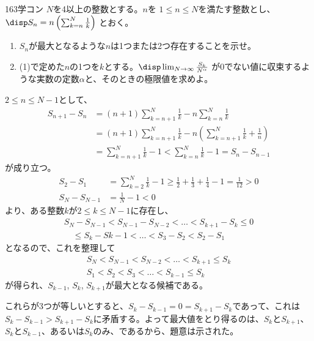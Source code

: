\begin{prob}{163}{\maru}{学コン}
 $N$を4以上の整数とする。$n$を $1\le n \le N$を満たす整数とし、$\disp S_n=n\left(\sum_{k=n}^N \frac{1}{k}\right)$ とおく。
 \begin{enumerate}
  \item $S_n$が最大となるような$n$は1つまたは2つ存在することを示せ。
  \item (1)で定めた$n$の1つを$k$とする。$\disp \lim_{N\to\infty} \frac{S_k}{N^\alpha}$ が0でない値に収束するような実数の定数$\alpha$と、そのときの極限値を求めよ。
 \end{enumerate}
\end{prob}
$2\le n\le N-1$として、
\begin{align*}
 S_{n+1}-S_n&=(n+1)\sum_{k=n+1}^N\frac{1}{k}-n\sum_{k=n}^N\frac{1}{k} \\
 &=(n+1)\sum_{k=n+1}^N\frac{1}{k}-n\left(\sum_{k=n+1}^N\frac{1}{k}+\frac{1}{n}\right) \\
 &=\sum_{k=n+1}^N\frac{1}{k}-1 < \sum_{k=n}^N\frac{1}{k}-1 = S_n-S_{n-1}
\end{align*}
が成り立つ。
\begin{align*}
 S_2-S_1&=\sum_{k=2}^N\frac{1}{k} -1 \ge \frac{1}{2}+\frac{1}{3}+\frac{1}{4}-1=\frac{1}{12}>0 \\
 S_N-S_{N-1}&=\frac{1}{N}-1 < 0
\end{align*}
より、ある整数$k$が$2\le k\le N-1$に存在し、
\begin{align*}
 S_N-S_{N-1}<S_{N-1}-S_{N-2}<\dots <S_{k+1}-S_{k}\le 0 \\
 \quad \le S_{k}-S{k-1}<\dots <S_3-S_2<S_2-S_1
\end{align*}
となるので、これを整理して
\begin{align*}
 S_N<S_{N-1}<S_{N-2}<\dots<S_{k+1}\le S_k \\
 S_1<S_2<S_3<\dots<S_{k-1}\le S_k
\end{align*}
が得られ、$S_{k-1}$, $S_k$, $S_{k+1}$が最大となる候補である。

これらが3つが等しいとすると、$S_k-S_{k-1}=0=S_{k+1}-S_k$であって、これは$S_k-S_{k-1}>S_{k+1}-S_k$に矛盾する。よって最大値をとり得るのは、$S_k$と$S_{k+1}$、$S_k$と$S_{k-1}$、あるいは$S_k$のみ、であるから、題意は示された。

